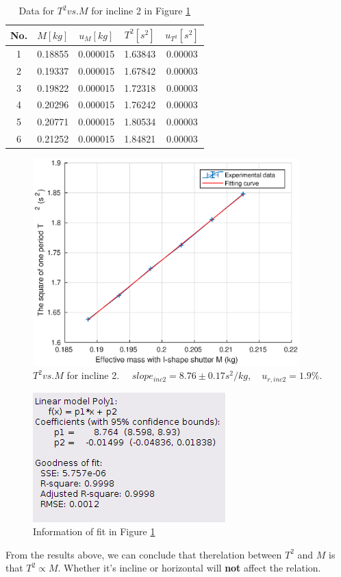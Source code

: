     \begin{table}\small
        \centering
        \begin{tabular}{|c|c|c|c|c|}
            \hline
            No. & $M[kg]$ & $u_{M}[kg]$ & $T^2[s^2]$ & $u_{T^2}[s^2]$\\ \hline
            1 & 0.18855 & 0.000015 & 1.63843 & 0.00003\\ \hline
            2 & 0.19337 & 0.000015 & 1.67842 & 0.00003\\ \hline
            3 & 0.19822 & 0.000015 & 1.72318 & 0.00003\\ \hline
            4 & 0.20296 & 0.000015 & 1.76242 & 0.00003\\ \hline
            5 & 0.20771 & 0.000015 & 1.80534 & 0.00003\\ \hline
            6 & 0.21252 & 0.000015 & 1.84821 & 0.00003\\ \hline
        \end{tabular}
        \caption{Data for $T^2 vs. M$ for incline 2 in Figure \ref{tmi2}}\label{tmi2data}
    \end{table}

    \begin{figure}[!h]
        \centering
        \includegraphics[height=8cm]{images/tmi2.eps}
        \caption{$T^2 vs. M$ for incline 2. $\quad slope_{inc2}=8.76\pm 0.17s^2/kg,\quad u_{r,inc2}=1.9\%.$}\label{tmi2}
    \end{figure}
    \begin{figure}[h]
        \centering
        \includegraphics[height=5cm]{images/tmi2info.png}
        \caption{Information of fit in Figure \ref{tmi2}}\label{tmi2info}
    \end{figure}
    From the results above, we can conclude that therelation between $T^2$ and $M$ is that $T^2\propto M$. Whether it's incline or horizontal will \textbf{not} affect the relation. 

